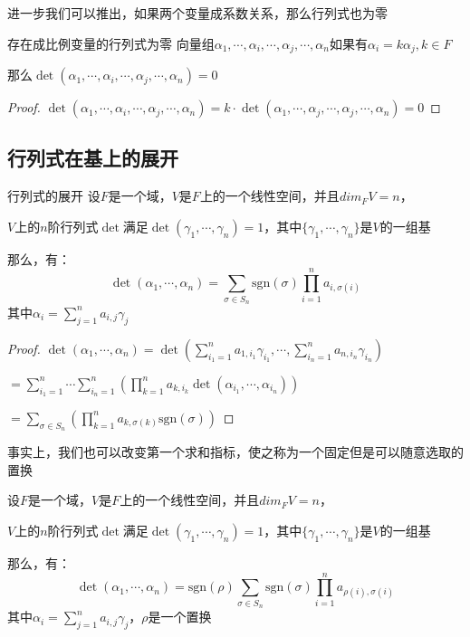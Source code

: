 \documentclass[12pt, a4paper, oneside, UTF8]{ctexbook}
\begin{document}
			进一步我们可以推出，如果两个变量成系数关系，那么行列式也为零
			\begin{corollary}{存在成比例变量的行列式为零}{}
				向量组$\alpha_1,\cdots,\alpha_i,\cdots,\alpha_j,\cdots,\alpha_n$如果有$\alpha_i=k\alpha_j,k\in F$

				那么$\det (\alpha_1,\cdots,\alpha_i,\cdots,\alpha_j,\cdots,\alpha_n)=0$
			\end{corollary}
			\begin{proof}
				$\det (\alpha_1,\cdots,\alpha_i,\cdots,\alpha_j,\cdots,\alpha_n)=k\cdot \det (\alpha_1,\cdots,\alpha_j,\cdots,\alpha_j,\cdots,\alpha_n)=0$
			\end{proof}
		\subsection{行列式在基上的展开}
			\begin{them}{行列式的展开}{}
				设$F$是一个域，$V$是$F$上的一个线性空间，并且$dim_F V = n$，
				
				$V$上的$n$阶行列式$\det$满足$\det(\gamma_1,\cdots,\gamma_n)=1$，其中$\{\gamma_1,\cdots,\gamma_n\}$是$V$的一组基

				那么，有：
				\begin{equation}
					\det(\alpha_1,\cdots,\alpha_n)=\sum_{\sigma \in S_n} \text{sgn}(\sigma) \prod_{i=1}^n a_{i,\sigma(i)}
				\end{equation}
				其中$\alpha_i = \sum\limits_{j=1}^{n} a_{i,j} \gamma_j$
			\end{them}
			\begin{proof}
				$\det (\alpha_1,\cdots,\alpha_n)=\det\left(\sum\limits_{i_1=1}^{n} a_{1,i_1} \gamma_{i_1},\cdots,\sum\limits_{i_n=1}^{n} a_{n,i_n} \gamma_{i_n}\right)$

				$=\sum\limits_{i_1=1}^{n}\cdots \sum\limits_{i_n=1}^{n} \left(\prod\limits_{k=1}^{n}a_{k,i_k} \det(\alpha_{i_1},\cdots,\alpha_{i_n})\right)$

				$=\sum\limits_{\sigma \in S_n} \left(\prod\limits_{k=1}^{n}a_{k,\sigma(k)} \text{sgn}(\sigma )\right)$
			\end{proof}
			事实上，我们也可以改变第一个求和指标，使之称为一个固定但是可以随意选取的置换
			\begin{corollary}{}{}
				设$F$是一个域，$V$是$F$上的一个线性空间，并且$dim_F V = n$，
				
				$V$上的$n$阶行列式$\det$满足$\det(\gamma_1,\cdots,\gamma_n)=1$，其中$\{\gamma_1,\cdots,\gamma_n\}$是$V$的一组基

				那么，有：
				\begin{equation}
					\det(\alpha_1,\cdots,\alpha_n)=\text{sgn}(\rho )\sum_{\sigma \in S_n} \text{sgn}(\sigma) \prod_{i=1}^n a_{\rho(i),\sigma(i)}
				\end{equation}
				其中$\alpha_i = \sum\limits_{j=1}^{n} a_{i,j} \gamma_j$，$\rho$是一个置换
			\end{corollary}
\end{document}
